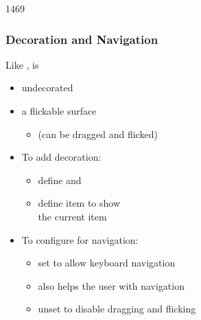 \begin{slide}{1469}\frametitle{Decoration and Navigation}

Like ,  is

\begin{itemize}
\item undecorated
\item a flickable surface
  \begin{itemize}
  \item (can be dragged and flicked)
  \end{itemize}
\end{itemize}

\vspace*{0.75em}
\begin{itemize}
\item To add decoration:
  \begin{itemize}
  \item define  and 
  \item define  item to show\\
        the current item
  \end{itemize}

\vspace*{0.75em}
\item To configure for navigation:
  \begin{itemize}
  \item set  to allow keyboard navigation
  \item {} also helps the user with navigation
  \item unset  to disable dragging and flicking
  \end{itemize}
\end{itemize}

\vspace*{0.5em}

\end{slide}


